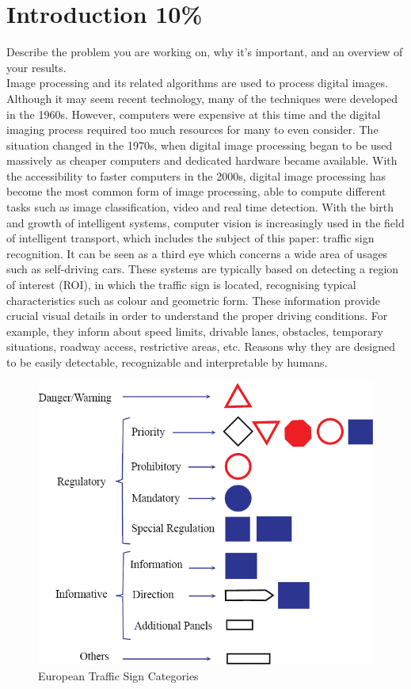 \section{Introduction 10\%}
Describe the problem you are working on, why it's important, and an overview of your results.\\
Image processing and its related algorithms are used to process digital images. Although it may seem recent technology, many of the techniques were developed in the 1960s. However, computers were expensive at this time and the digital imaging process required too much resources for many to even consider. The situation changed in the 1970s, when digital image processing began to be used massively as cheaper computers and dedicated hardware became available. With the accessibility to faster computers in the 2000s, digital image processing has become the most common form of image processing, able to compute different tasks such as image classification, video and real time detection. With the birth and growth of intelligent systems, computer vision is increasingly used in the field of intelligent transport, which includes the subject of this paper: traffic sign recognition. It can be seen as a third eye which concerns a wide area of usages such as self-driving cars. These systems are typically based on detecting a region of interest (ROI), in which the traffic sign is located, recognising typical characteristics such as colour and geometric form. These information provide crucial visual details in order to understand the proper driving conditions. For example, they inform about speed limits, drivable lanes, obstacles, temporary situations, roadway access, restrictive areas, etc. Reasons why they are designed to be easily detectable, recognizable and interpretable by humans.
\begin{figure}[h]
	\includegraphics[width=\linewidth]{Res/Immagini/european-traffic-signs.PNG}	
	\caption{European Traffic Sign Categories}
\end{figure}


